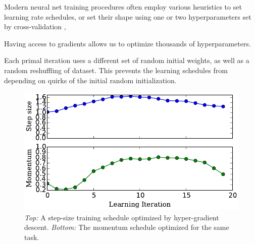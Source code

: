\documentclass{article}
\begin{document}
Modern neural net training procedures often employ various heuristics to set learning rate schedules, or set their shape using one or two hyperparameters set by cross-validation \citep{dahl2014multi}, \citep{sutskever2013importance}

Having access to gradients allows us to optimize thousands of hyperparameters.

Each primal iteration uses a different set of random initial weights, as well as a random reshuffling of dataset.
This prevents the learning schedules from depending on quirks of the initial random initialization.

\begin{figure}[h!]
\vskip 0.2in
\begin{center}
\centerline{\includegraphics[width=\columnwidth]{../experiments/Jan_28_training_schedule/4_training_loss_nn/alpha_beta_paper.pdf}}
\caption{\emph{Top:} A step-size training schedule optimized by hyper-gradient descent.
\emph{Bottom:} The momentum schedule optimized for the same task.}
\label{fig:optimal schedule}
\end{center}
\vskip -0.2in
\end{figure} 
\end{document}
